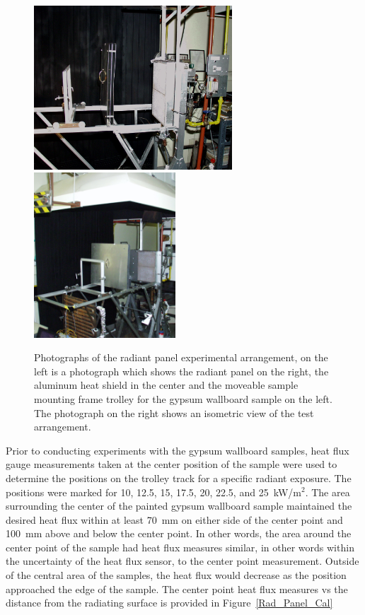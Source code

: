 \documentclass[twoside]{uocthesis}
\begin{document}
\begin{figure}
	\centering
	\includegraphics[width=2.92in]{../Figures/RAD_pan}
	\includegraphics[width=2.08in]{../Figures/RAD_pan_iso} \\
	\caption[Photographs of the radiant panel experimental arrangement]{Photographs of the radiant panel experimental arrangement, on the left is a photograph which shows the radiant panel on the right, the aluminum heat shield in the center and the moveable sample mounting frame trolley for the gypsum wallboard sample on the left.  The photograph on the right shows an isometric view of the test arrangement.}
	\label{Rad_Panel}
\end{figure}

Prior to conducting experiments with the gypsum wallboard samples, heat flux gauge measurements taken at the center position of the sample were used to determine the positions on the trolley track for a specific radiant exposure. The positions were marked for 10, 12.5, 15, 17.5, 20, 22.5, and 25~kW/m$^2$. The area surrounding the center of the painted gypsum wallboard sample maintained the desired heat flux within at least 70~mm on either side of the center point and 100~mm above and below the center point.  In other words, the area around the center point of the sample had heat flux measures similar, in other words within the uncertainty of the heat flux sensor, to the center point measurement. Outside of the central area of the samples, the heat flux would decrease as the position approached the edge of the sample.  The center point heat flux measures vs the distance from the radiating surface is provided in Figure~\ref{Rad_Panel_Cal}   
\end{document}
